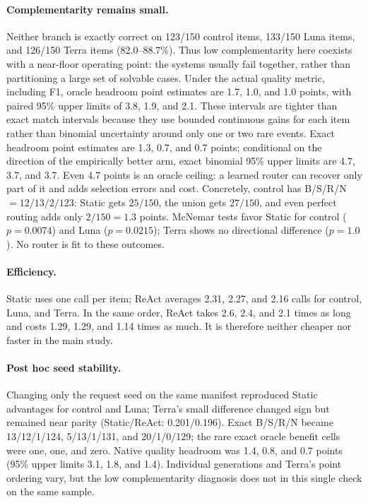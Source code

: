 \paragraph{Complementarity remains small.}
Neither branch is exactly correct on 123/150 control items, 133/150 Luna
items, and 126/150 Terra items (82.0--88.7\%). Thus low complementarity here
coexists with a near-floor operating point: the systems usually fail together,
rather than partitioning a large set of solvable cases.
Under the actual quality metric, including F1, oracle headroom point estimates
are 1.7, 1.0, and 1.0 points, with paired 95\% upper limits of 3.8, 1.9, and
2.1. These intervals are tighter than exact match intervals because they use
bounded continuous gains for each item rather than binomial uncertainty around
only one or two rare events. Exact headroom point estimates are 1.3, 0.7, and
0.7 points; conditional on the direction of the empirically better arm, exact binomial
95\% upper limits are 4.7, 3.7, and 3.7. Even 4.7 points is an oracle ceiling:
a learned router can recover only part of it and adds selection errors and
cost. Concretely, control has B/S/R/N $=12/13/2/123$: Static gets
$25/150$, the union gets $27/150$, and even perfect routing adds only
$2/150=1.3$ points. McNemar tests favor Static for control ($p=0.0074$) and Luna
($p=0.0215$); Terra shows no directional difference ($p=1.0$). No router is fit
to these outcomes.

\paragraph{Efficiency.}
Static uses one call per item; ReAct averages 2.31, 2.27, and 2.16 calls for
control, Luna, and Terra. In the same order, ReAct takes 2.6, 2.4, and 2.1
times as long and costs 1.29, 1.29, and 1.14 times as much. It is therefore
neither cheaper nor faster in the main study.

\paragraph{Post hoc seed stability.}
Changing only the request seed on the same manifest reproduced Static
advantages for control and Luna; Terra's small difference changed sign but
remained near parity (Static/ReAct: 0.201/0.196). Exact B/S/R/N became
13/12/1/124, 5/13/1/131, and 20/1/0/129; the rare exact oracle benefit cells
were one, one, and zero. Native quality headroom was 1.4, 0.8, and 0.7 points
(95\% upper limits 3.1, 1.8, and 1.4). Individual generations and Terra's point
ordering vary, but the low complementarity diagnosis does not in this single
check on the same sample.

